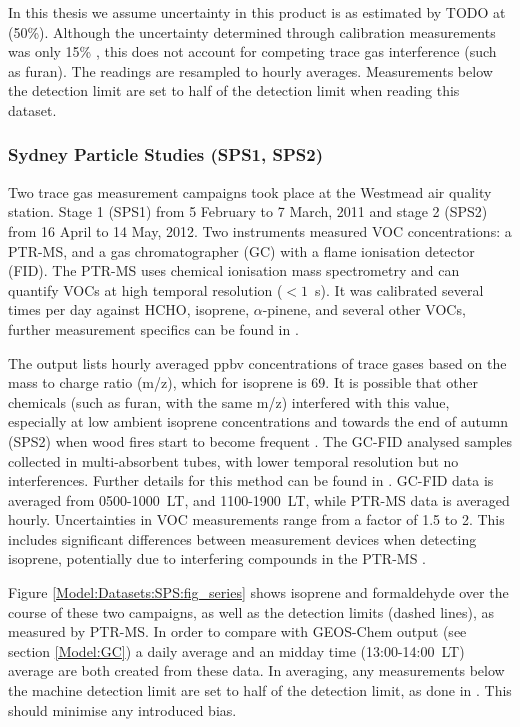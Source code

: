     In this thesis we assume uncertainty in this product is as estimated by TODO at (50\%).
    Although the uncertainty determined through calibration measurements was only 15\% \parencite{Guerette2018}, this does not account for competing trace gas interference (such as furan).
    The readings are resampled to hourly averages.
    Measurements below the detection limit are set to half of the detection limit when reading this dataset.
    
    \subsubsection{Sydney Particle Studies (SPS1, SPS2)}
    \label{Model:Datasets:SPS}
    Two trace gas measurement campaigns took place at the Westmead air quality station. %
    Stage 1 (SPS1) from 5 February to 7 March, 2011 and stage 2 (SPS2) from 16 April to 14 May, 2012.
    Two instruments measured VOC concentrations: a PTR-MS, and a gas chromatographer (GC) with a flame ionisation detector (FID).
    The PTR-MS uses chemical ionisation mass spectrometry and can quantify VOCs at high temporal resolution ($< 1$~s).
    It was calibrated several times per day against HCHO, isoprene, $\alpha$-pinene, and several other VOCs, further measurement specifics can be found in \textcite{Dunne2018}.
    
    The output lists hourly averaged ppbv concentrations of trace gases based on the mass to charge ratio (m/z), which for isoprene is 69.
    It is possible that other chemicals (such as furan, with the same m/z) interfered with this value, especially at low ambient isoprene concentrations and towards the end of autumn (SPS2) when wood fires start to become frequent \parencite{Guerette2018}.
    The GC-FID analysed samples collected in multi-absorbent tubes, with lower temporal resolution but no interferences. 
    Further details for this method can be found in \textcite{Cheng2016}.
    GC-FID data is averaged from 0500-1000~LT, and 1100-1900~LT, while PTR-MS data is averaged hourly.
    Uncertainties in VOC measurements range from a factor of 1.5 to 2.
    This includes significant differences between measurement devices when detecting isoprene, potentially due to interfering compounds in the PTR-MS \parencite{Dunne2018}.
    
    Figure \ref{Model:Datasets:SPS:fig_series} shows isoprene and formaldehyde over the course of these two campaigns, as well as the detection limits (dashed lines), as measured by PTR-MS. 
    In order to compare with GEOS-Chem output (see section \ref{Model:GC}) a daily average and an midday time (13:00-14:00~LT) average are both created from these data.
    In averaging, any measurements below the machine detection limit are set to half of the detection limit, as done in \textcite{Lawson2015}. 
    This should minimise any introduced bias.
    
